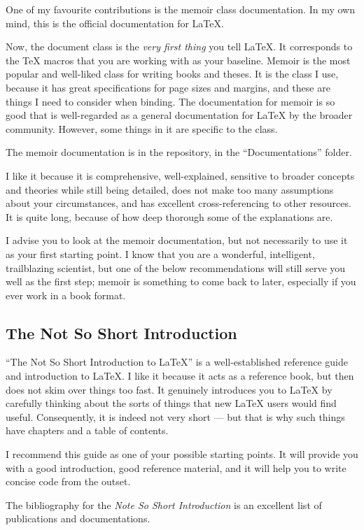 \documentclass[11pt, oneside]{memoir}
\begin{document}
One of my favourite contributions is the memoir class documentation. In my own mind, this is the official documentation for LaTeX.

Now, the document class is the \emph{very first thing} you tell LaTeX. It corresponds to the TeX macros that you are working with as your baseline. Memoir is the most popular and well-liked class for writing books and theses. It is the class I use, because it has great specifications for page sizes and margins, and these are things I need to consider when binding. The documentation for memoir is so good that is well-regarded as a general documentation for LaTeX by the broader community. However, some things in it are specific to the class.

The memoir documentation is in the repository, in the  ``Documentations'' folder. 

I like it because it is comprehensive, well-explained, sensitive to broader concepts and theories while still being detailed, does not make too many assumptions about your circumstances, and has excellent cross-referencing to other resources. It is quite long, because of how deep thorough some of the explanations are.

I advise you to look at the memoir documentation, but not necessarily to use it as your first starting point. I know that you are a wonderful, intelligent, trailblazing scientist, but one of the below recommendations will still serve you well as the first step; memoir is something to come back to later, especially if you ever work in a book format.

\subsection{The Not So Short Introduction}

``The Not So Short Introduction to LaTeX'' is a well-established reference guide and introduction to LaTeX. I like it because it acts as a reference book, but then does not skim over things too fast. It genuinely introduces you to LaTeX by carefully thinking about the sorts of things that new LaTeX users would find useful. Consequently, it is indeed not very short — but that is why such things have chapters and a table of contents.

I recommend this guide as one of your possible starting points. It will provide you with a good introduction, good reference material, and it will help you to write concise code from the outset.

The bibliography for the \emph{Note So Short Introduction} is an excellent list of publications and documentations.
\end{document}

